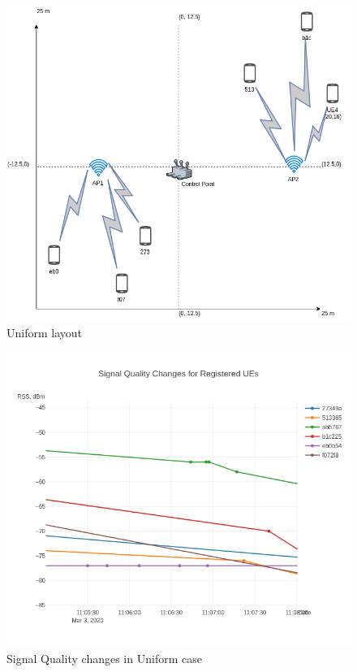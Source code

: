\begin{figure}[H]
	\centering
	\includegraphics[width=\linewidth,keepaspectratio]{images/05-cases-description-Exp4-Uniform.png}
	\caption{Uniform layout}
\end{figure}

\begin{figure}[H]
	\centering
	\includegraphics[width=\linewidth,keepaspectratio]{images/Exp4_Uniform.png}
\caption{Signal Quality changes in Uniform case}
\end{figure}

